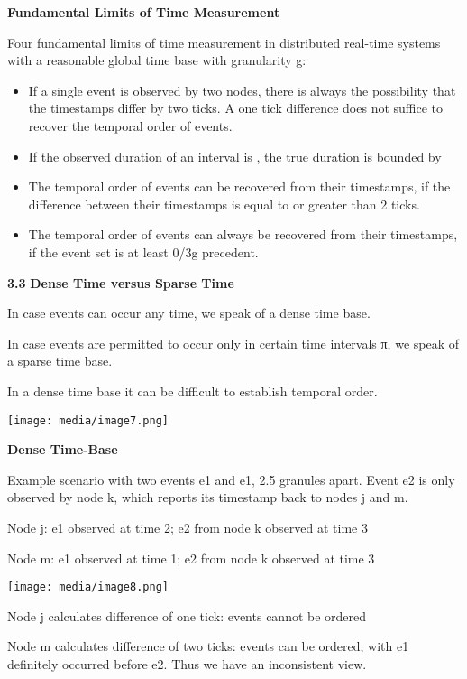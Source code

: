 \textbf{Fundamental Limits of Time Measurement}

Four fundamental limits of time measurement in distributed real-time
systems with a reasonable global time base with granularity g:

\begin{itemize}
\item
  If a single event is observed by two nodes, there is always the
  possibility that the timestamps differ by two ticks. A one tick
  difference does not suffice to recover the temporal order of events.
\item
  If the observed duration of an interval is , the true duration is
  bounded by
\item
  The temporal order of events can be recovered from their timestamps,
  if the difference between their timestamps is equal to or greater than
  2 ticks.
\item
  The temporal order of events can always be recovered from their
  timestamps, if the event set is at least 0/3g precedent.
\end{itemize}

\textbf{3.3} \protect\hypertarget{teil4}{}{}\textbf{Dense Time versus
Sparse Time }

In case events can occur any time, we speak of a dense time base.

In case events are permitted to occur only in certain time intervals π,
we speak of a sparse time base.

In a dense time base it can be difficult to establish temporal order.

\texttt{[image: media/image7.png]}

\textbf{Dense Time-Base}

Example scenario with two events e1 and e1, 2.5 granules apart. Event e2
is only observed by node k, which reports its timestamp back to nodes j
and m.

Node j: e1 observed at time 2; e2 from node k observed at time 3

Node m: e1 observed at time 1; e2 from node k observed at time 3

\texttt{[image: media/image8.png]}

Node j calculates difference of one tick: events cannot be ordered

Node m calculates difference of two ticks: events can be ordered, with
e1 definitely occurred before e2. Thus we have an inconsistent view.

